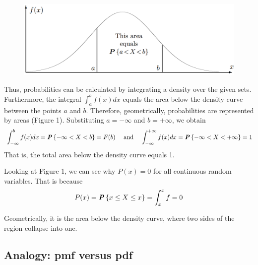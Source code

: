 \begin{figure}[ht]
  \centering
  \includegraphics*[width=.5\textwidth]{img/Fig4.1.png}
  \caption{}
\end{figure}

Thus, probabilities can be calculated by integrating a density over the given sets. Furthermore, the integral $\int_a^b f(x)dx$ equals the area below the density curve between the points $a$ and $b$. Therefore, geometrically, probabilities are represented by areas (Figure 1). Substituting $a = -\infty$ and $b = +\infty$, we obtain
\begin{align*}
  &\int_{-\infty}^b f(x)dx = \textbf{\textit{P}}\left\{-\infty < X < b\right\} = F(b)&\textnormal{ and }& &\int_{-\infty}^{+\infty} f(x)dx = \textbf{\textit{P}}\left\{-\infty < X < +\infty\right\} = 1
\end{align*}
That is, the total area below the density curve equals 1.

Looking at Figure 1, we can see why $P(x) = 0$ for all continuous random variables. That is because
\begin{equation*}
  P(x) = \textbf{\textit{P}}\left\{x \leq X \leq x\right\} = \int_x^x f = 0
\end{equation*}

Geometrically, it is the area below the density curve, where two sides of the region collapse into one.

\subsection{Analogy: pmf versus pdf}

